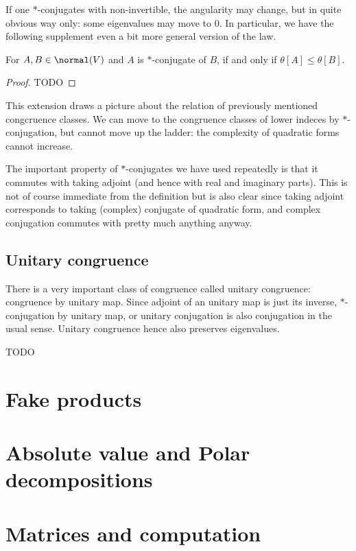If one $*$-conjugates with non-invertible, the angularity may change, but in quite obvious way only: some eigenvalues may move to $0$. In particular, we have the following supplement even a bit more general version of the law.

\begin{lause}
	For $A, B \in \normal(V)$ and $A$ is $*$-conjugate of $B$, if and only if $\theta[A] \leq \theta[B]$.
\end{lause}
\begin{proof}
	TODO
\end{proof}

This extension draws a picture about the relation of previously mentioned congcruence classes. We can move to the congruence classes of lower indeces by $*$-conjugation, but cannot move up the ladder: the complexity of quadratic forms cannot increase.

The important property of $*$-conjugates we have used repeatedly is that it commutes with taking adjoint (and hence with real and imaginary parts). This is not of course immediate from the definition but is also clear since taking adjoint corresponds to taking (complex) conjugate of quadratic form, and complex conjugation commutes with pretty much anything anyway.

\subsection{Unitary congruence}

There is a very important class of congruence called unitary congruence: congruence by unitary map. Since adjoint of an unitary map is just its inverse, $*$-conjugation by unitary map, or unitary conjugation is also conjugation in the usual sense. Unitary congruence hence also preserves eigenvalues.

TODO

\section{Fake products}

\section{Absolute value and Polar decompositions}

\section{Matrices and computation}

